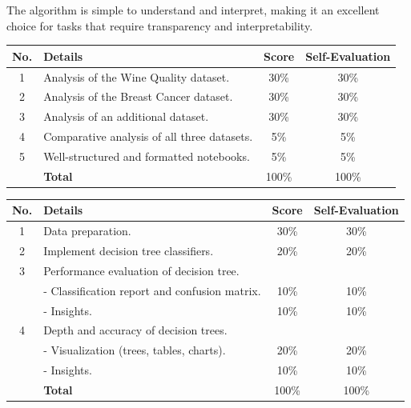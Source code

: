 \documentclass{article}
\begin{document}
The algorithm is simple to understand and interpret, making it an excellent choice for tasks that require transparency and interpretability.



\begin{table}[h!]
    \centering
    \begin{tabular}{|c|p{10cm}|c|c|}
    \hline
    \textbf{No.} & \textbf{Details} & \textbf{Score} & \textbf{Self-Evaluation} \\
    \hline
    1 & Analysis of the Wine Quality dataset.  & 30\% & 30\%\\
    \hline
    2 & Analysis of the Breast Cancer dataset. & 30\% & 30\%\\
    \hline
    3 & Analysis of an additional dataset. & 30\% & 30\%\\
    \hline
    4 & Comparative analysis of all three datasets. & 5\% & 5\%\\
    \hline
    5 & Well-structured and formatted notebooks. & 5\% & 5\%\\
    \hline
    & \textbf{Total} & 100\% & 100\% \\
    \hline
    \end{tabular}
    \end{table}
    
    \begin{table}[h!]
    \centering
    \begin{tabular}{|c|p{10cm}|c|c|}
    \hline
    \textbf{No.} & \textbf{Details} & \textbf{Score} & \textbf{Self-Evaluation} \\
    \hline
    1 & Data preparation.  & 30\% & 30\%\\
    \hline
    2 & Implement decision tree classifiers. & 20\% & 20\%\\
    \hline
    3 & Performance evaluation of decision tree. &  & \\
    \hline
    & - Classification report and confusion matrix. & 10\% & 10\%\\
    \hline
    & - Insights. & 10\% & 10\%\\
    \hline
    4 & Depth and accuracy of decision trees. &  & \\
    \hline
    & - Visualization (trees, tables, charts). & 20\% & 20\%\\
    \hline
    & - Insights. & 10\% & 10\%\\
    \hline
    & \textbf{Total} & 100\% & 100\% \\
    \hline
    \end{tabular}
    \end{table}
    
\end{document}
